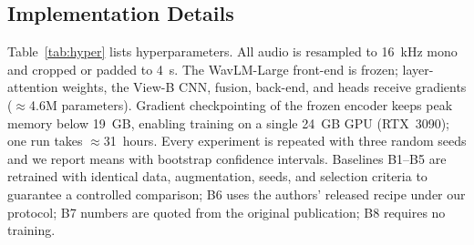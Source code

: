 \subsection{Implementation Details}
\label{ssec:implementation}

\begin{table}[t]
\centering
\caption{Training hyperparameters (selected on the ASVspoof~2019~LA dev set).}
\label{tab:hyper}
\footnotesize
\setlength{\tabcolsep}{5pt}
\end{table}

Table~\ref{tab:hyper} lists hyperparameters. All audio is resampled to 16~kHz mono and
cropped or padded to 4~s. The WavLM-Large front-end is frozen; layer-attention weights,
the View-B CNN, fusion, back-end, and heads receive gradients ($\approx$4.6M
parameters). Gradient checkpointing of the frozen encoder keeps peak memory below
19~GB, enabling training on a single 24~GB GPU (RTX~3090); one run takes
$\approx$31~hours. Every experiment is repeated with three random seeds and we report
means with bootstrap confidence intervals. Baselines B1--B5 are retrained with
identical data, augmentation, seeds, and selection criteria to guarantee a controlled
comparison; B6 uses the authors' released recipe under our protocol; B7 numbers are
quoted from the original publication; B8 requires no training.

